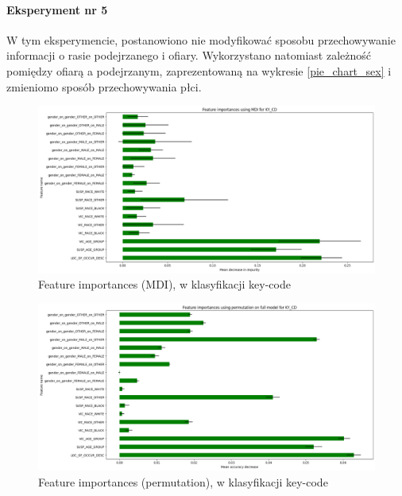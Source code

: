\documentclass{classrep}
\begin{document}
{{{                \paragraph{Eksperyment nr 5}{
                    W tym eksperymencie, postanowiono nie modyfikować sposobu
                    przechowywanie informacji o rasie podejrzanego i ofiary.
                    Wykorzystano natomiast zależność pomiędzy ofiarą a podejrzanym,
                    zaprezentowaną na wykresie \ref{pie_chart_sex} i zmieniomo sposób
                    przechowywania płci.
                    \begin{figure}[!htbp]
                        \centering
                        \includegraphics[width=\textwidth]{img/5.1.3/5/Feature importances using MDI for KY_CD.png}
                        \caption{Feature importances (MDI), w klasyfikacji key-code}
                        \label{goal_1_exp_5_imp_mdi_key}
                    \end{figure}
                    
                    \begin{figure}[!htbp]
                        \centering
                        \includegraphics[width=\textwidth]{img/5.1.3/5/Feature importances using permutation on full model for KY_CD.png}
                        \caption{Feature importances (permutation), w klasyfikacji key-code}
                        \label{goal_1_exp_5_imp_perm_key}
                    \end{figure}
                    
}}}}
\end{document}
